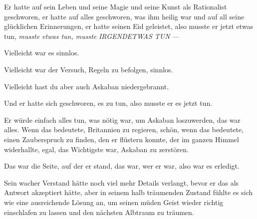 Er hatte auf sein Leben und seine Magie und seine Kunst als Rationalist geschworen, er hatte auf alles geschworen, was ihm heilig war und auf all seine glücklichen Erinnerungen, er hatte seinen Eid geleistet, also musste er jetzt etwas tun, \emph{musste etwas tun, musste} \emph{IRGENDETWAS TUN} —

Vielleicht war es sinnlos.

Vielleicht war der Versuch, Regeln zu befolgen, sinnlos.

Vielleicht hast du aber auch Askaban niedergebrannt.

Und er hatte sich geschworen, es zu tun, also musste er es jetzt tun.

Er würde einfach alles tun, was nötig war, um Askaban loszuwerden, das war alles. Wenn das bedeutete, Britannien zu regieren, schön, wenn das bedeutete, einen Zauberspruch zu finden, den er flüstern konnte, der im ganzen Himmel widerhallte, egal, das Wichtigste war, Askaban zu zerstören.

Das war die Seite, auf der er stand, das war, wer er war, also war es erledigt.

Sein wacher Verstand hätte noch viel mehr Details verlangt, bevor er das als Antwort akzeptiert hätte, aber in seinem halb träumenden Zustand fühlte es sich wie eine ausreichende Lösung an, um seinen müden Geist wieder richtig einschlafen zu lassen und den nächsten Albtraum zu träumen.


